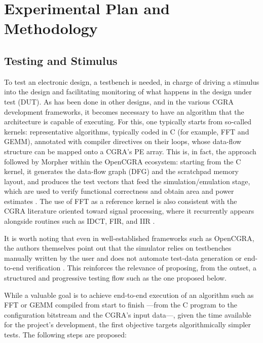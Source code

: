 \documentclass[conference]{IEEEtran}
\begin{document}
\section{Experimental Plan and Methodology}%
\label{sec:experimento}
\subsection{Testing and Stimulus}

To test an electronic design, a testbench is needed, in charge of driving a stimulus into the design and facilitating monitoring of what happens in the design under test (DUT). As has been done in other designs, and in the various CGRA development frameworks, it becomes necessary to have an algorithm that the architecture is capable of executing. For this, one typically starts from so-called kernels: representative algorithms, typically coded in C (for example, FFT and GEMM), annotated with compiler directives on their loops, whose data-flow structure can be mapped onto a CGRA's PE array. This is, in fact, the approach followed by Morpher within the OpenCGRA ecosystem: starting from the C kernel, it generates the data-flow graph (DFG) and the scratchpad memory layout, and produces the test vectors that feed the simulation/emulation stage, which are used to verify functional correctness and obtain area and power estimates \cite{Juneja}. The use of FFT as a reference kernel is also consistent with the CGRA literature oriented toward signal processing, where it recurrently appears alongside routines such as IDCT, FIR, and IIR \cite{Podobas}.

It is worth noting that even in well-established frameworks such as OpenCGRA, the authors themselves point out that the simulator relies on testbenches manually written by the user and does not automate test-data generation or end-to-end verification \cite{Juneja}. This reinforces the relevance of proposing, from the outset, a structured and progressive testing flow such as the one proposed below.

While a valuable goal is to achieve end-to-end execution of an algorithm such as FFT or GEMM compiled from start to finish ---from the C program to the configuration bitstream and the CGRA's input data---, given the time available for the project's development, the first objective targets algorithmically simpler tests. The following steps are proposed:
\end{document}
